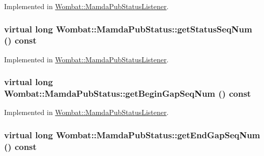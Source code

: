Implemented in \hyperlink{classWombat_1_1MamdaPubStatusListener_6a41fa38621e9165330688951656e3c3}{Wombat::Mamda\-Pub\-Status\-Listener}.\hypertarget{classWombat_1_1MamdaPubStatus_d954ab6ff4df01d45ff44a616745e515}{
\subsubsection[getStatusSeqNum]{\setlength{\rightskip}{0pt plus 5cm}virtual long Wombat::Mamda\-Pub\-Status::get\-Status\-Seq\-Num () const}}
\label{classWombat_1_1MamdaPubStatus_d954ab6ff4df01d45ff44a616745e515}




Implemented in \hyperlink{classWombat_1_1MamdaPubStatusListener_a3125f864d901d9d788778238c50c370}{Wombat::Mamda\-Pub\-Status\-Listener}.\hypertarget{classWombat_1_1MamdaPubStatus_61827ba531d12dfb8de2e8713fd8f628}{
\subsubsection[getBeginGapSeqNum]{\setlength{\rightskip}{0pt plus 5cm}virtual long Wombat::Mamda\-Pub\-Status::get\-Begin\-Gap\-Seq\-Num () const}}
\label{classWombat_1_1MamdaPubStatus_61827ba531d12dfb8de2e8713fd8f628}




Implemented in \hyperlink{classWombat_1_1MamdaPubStatusListener_ce7c4b6ae1c1508087ae25b2a8e1d61e}{Wombat::Mamda\-Pub\-Status\-Listener}.\hypertarget{classWombat_1_1MamdaPubStatus_96f29e18a6b74143b81a8a523e8bbeea}{
\subsubsection[getEndGapSeqNum]{\setlength{\rightskip}{0pt plus 5cm}virtual long Wombat::Mamda\-Pub\-Status::get\-End\-Gap\-Seq\-Num () const}}
\label{classWombat_1_1MamdaPubStatus_96f29e18a6b74143b81a8a523e8bbeea}




